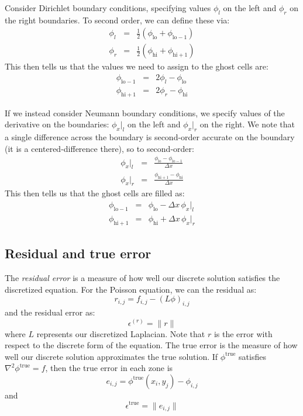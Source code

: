 Consider Dirichlet boundary conditions, specifying values $\phi_l$ on
the left and $\phi_r$ on the right boundaries.  To second order, we can
define these via:
\begin{eqnarray}
\phi_l &=& \frac{1}{2} ( \phi_\mathrm{lo} + \phi_\mathrm{lo-1} ) \\
\phi_r &=& \frac{1}{2} ( \phi_\mathrm{hi} + \phi_\mathrm{hi+1} )
\end{eqnarray}
This then tells us that the values we need to assign to the ghost cells are:
\begin{eqnarray}
\phi_\mathrm{lo-1} &=& 2 \phi_l - \phi_\mathrm{lo} \\
\phi_\mathrm{hi+1} &=& 2 \phi_r - \phi_\mathrm{hi}
\end{eqnarray}

If we instead consider Neumann boundary conditions, we specify values
of the derivative on the boundaries: $\phi_x |_l$ on the left and
$\phi_x |_r$ on the right.  We note that a single difference across
the boundary is second-order accurate on the boundary (it is a
centered-difference there), so to second-order:
\begin{eqnarray}
\phi_x |_l &=& \frac{\phi_\mathrm{lo} - \phi_\mathrm{lo-1}}{\Delta x} \\
\phi_x |_r &=& \frac{\phi_\mathrm{hi+1} - \phi_\mathrm{hi}}{\Delta x}
\end{eqnarray}
This then tells us that the ghost cells are filled as:
\begin{eqnarray}
\phi_\mathrm{lo-1} &=& \phi_\mathrm{lo} - \Delta x \, \phi_x |_l \\
\phi_\mathrm{hi+1} &=& \phi_\mathrm{hi} + \Delta x \, \phi_x |_r
\end{eqnarray}


\subsection{Residual and true error}

The {\em residual error} is a measure of how well our discrete solution
satisfies the discretized equation.  For the Poisson equation, we
can the residual as:
\begin{equation}
r_{i,j} = f_{i,j} - (L \phi)_{i,j} 
\end{equation}
and the residual error as:
\begin{equation}
\epsilon^{(r)} = \| r \|
\end{equation}
where $L$ represents our discretized Laplacian.  Note that $r$ is the
error with respect to the discrete form of the equation.  The true
error is the measure of how well our discrete solution approximates
the true solution.  If $\phi^\mathrm{true}$ satisfies $\nabla^2
\phi^\mathrm{true} = f$, then the true error in each zone is
\begin{equation}
e_{i,j} = \phi^\mathrm{true}(x_i,y_j) - \phi_{i,j} 
\end{equation}
and
\begin{equation}
\epsilon^\mathrm{true} = \| e_{i,j} \|
\end{equation}

